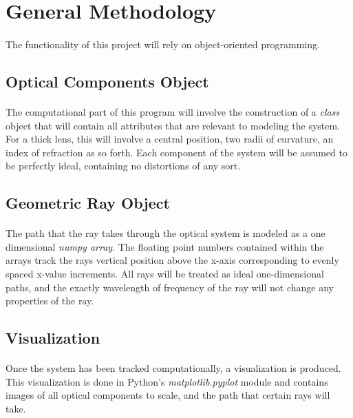 \documentclass[12pt,letterpaper]{article}
\begin{document}
\section{General Methodology}
\paragraph*{}The functionality of this project will rely on object-oriented programming. 


\subsection{Optical Components Object}
\paragraph*{}The computational part of this program will involve the construction of a \textit{class} object that will contain all attributes that are relevant to modeling the system. For a thick lens, this will involve a central position, two radii of curvature, an index of refraction as so forth. Each component of the system will be assumed to be perfectly ideal, containing no distortions of any sort.


\subsection{Geometric Ray Object}
\paragraph*{}The path that the ray takes through the optical system is modeled as a one dimensional \textit{numpy array}. The floating point numbers contained within the arrays track the rays vertical position above the x-axis corresponding to evenly spaced x-value increments. All rays will be treated as ideal one-dimensional paths, and the exactly wavelength of frequency of the ray will not change any properties of the ray.


\subsection{Visualization}
\paragraph*{}Once the system has been tracked computationally, a visualization is produced. This visualization is done in Python's \textit{matplotlib.pyplot} module and contains images of all optical components to scale, and the path that certain rays will take.
\end{document}
